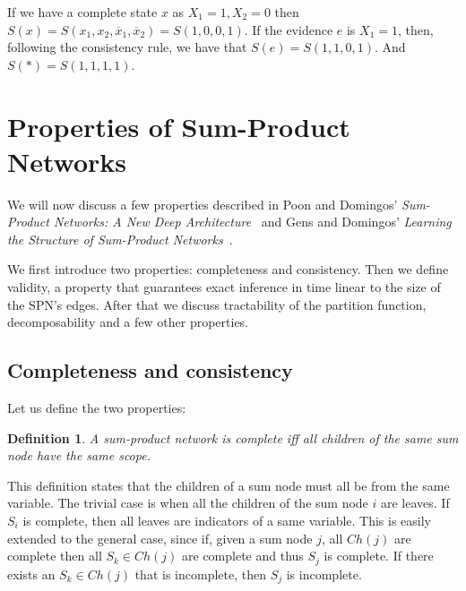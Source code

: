 \documentclass[a4paper,10pt]{article}
\theoremstyle{plain}
\newtheorem*{spn-def}{Definition}
\begin{document}
If we have a complete state $x$ as $X_1=1,X_2=0$ then $S(x)=S(x_1,x_2,\overline{x}_1,
\overline{x}_2)=S(1,0,0,1)$. If the evidence $e$ is $X_1=1$, then, following the consistency rule,
we have that $S(e)=S(1,1,0,1)$. And $S(*)=S(1,1,1,1)$.

\section{Properties of Sum-Product Networks}

We will now discuss a few properties described in Poon and Domingos' \textit{Sum-Product Networks:
A New Deep Architecture}~\cite{poon-domingos} and Gens and Domingos' \textit{Learning the Structure
of Sum-Product Networks}~\cite{gens-domingos}.

We first introduce two properties: completeness and consistency. Then we define validity, a
property that guarantees exact inference in time linear to the size of the SPN's edges. After that
we discuss tractability of the partition function, decomposability and a few other properties.

\subsection{Completeness and consistency}

Let us define the two properties:

\begin{spn-def}
  A sum-product network is complete iff all children of the same sum node have the same scope.
\end{spn-def}

This definition states that the children of a sum node must all be from the same variable.
The trivial case is when all the children of the sum node $i$ are leaves. If $S_i$ is complete,
then all leaves are indicators of a same variable. This is easily extended to the general case,
since if, given a sum node $j$, all $Ch(j)$ are complete then all $S_k\in Ch(j)$ are complete and
thus $S_j$ is complete. If there exists an $S_k\in Ch(j)$ that is incomplete, then $S_j$ is
incomplete.
\end{document}
